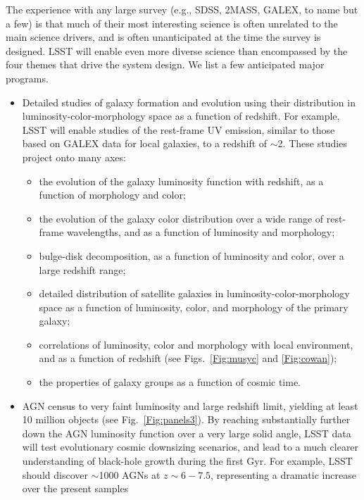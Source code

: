 \documentclass{emulateapj}
\begin{document}
The experience with any large survey (e.g., SDSS, 2MASS, GALEX, to name but a 
few) is that much of their most interesting science is often unrelated to 
the main science drivers, and is often unanticipated at the time the survey is 
designed. LSST will enable even more diverse science than encompassed by the 
four themes that drive the system design. We list a few anticipated major 
programs.

\begin{itemize}
\item Detailed studies of galaxy formation and evolution using their distribution in 
luminosity-color-morphology space as a function of redshift. For example, LSST will 
enable studies of the rest-frame UV emission, similar to those based on GALEX data 
for local galaxies, to a redshift of $\sim$2. These studies project onto many axes:
\begin{itemize}
  \item the evolution of the galaxy luminosity function with redshift, as a function of 
        morphology and color;
  \item the evolution of the galaxy color distribution over a wide range of rest-frame 
        wavelengths, and as a function of luminosity and morphology; 
  \item bulge-disk decomposition, as a function of luminosity and color, over 
        a large redshift range; 
  \item detailed distribution of satellite galaxies in luminosity-color-morphology space 
        as a function of luminosity, color, and morphology of the primary galaxy; 
  \item correlations of luminosity, color and morphology with local environment, and
        as a function of redshift (see  Figs.~\ref{Fig:musyc} and \ref{Fig:cowan});
  \item the properties of galaxy groups as a function of cosmic time.
\end{itemize}
\item AGN census to very faint luminosity and large redshift limit, yielding
      at least 10 million objects (see Fig.~\ref{Fig:panels3}). By reaching substantially further 
      down the AGN luminosity function over a very large solid angle, LSST data 
      will test evolutionary cosmic downsizing scenarios, and lead 
      to a much clearer understanding of black-hole growth during the first Gyr. For
      example, LSST should discover $\sim$1000 AGNs at $z\sim6-7.5$,
      representing a dramatic increase over the present samples 

\end{itemize}
\end{document}
